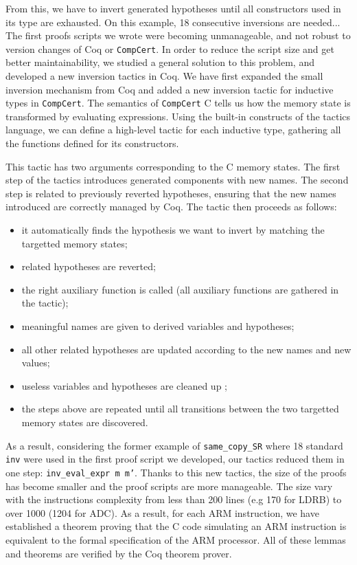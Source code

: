 \documentclass[twocolumn]{article}
\newcommand{\coqdockw}[1]{\texttt{#1}}
\newcommand{\inv}{\coqdockw{inv}\xspace}
\newcommand{\compcert}{\texttt{CompCert}\xspace}
\begin{document}
From this, we have to invert generated hypotheses until all
constructors used in its type are exhausted. On this example, 18
consecutive inversions are needed... The first proofs scripts we wrote
were becoming unmanageable, and not robust to version changes of Coq
or \compcert.  In order to reduce the script size and get better
maintainability, we studied a general solution to this problem, and
developed a new inversion tactics in Coq. We have first expanded the
small inversion mechanism from Coq and added a new inversion tactic
for inductive types in \compcert.  The semantics of \compcert C tells
us how the memory state is transformed by evaluating expressions.
Using the built-in constructs of the tactics language, we can define a
high-level tactic for each inductive type, gathering all the functions
defined for its constructors.

This tactic has two arguments corresponding to the C memory states.
The first step of the tactics introduces generated components with new
names.  The second step is related to previously reverted hypotheses,
ensuring that the new names introduced are correctly managed by Coq.
The tactic then proceeds as follows:
\begin{itemize}
\item
it automatically finds the hypothesis we want
to invert by matching the targetted memory states;
\item
related hypotheses are reverted;
\item
the right auxiliary function is called
(all auxiliary functions are gathered in the tactic);
\item
meaningful names are given to derived variables and hypotheses;
\item
all other related hypotheses are updated according to the new names
and new values;
\item
useless variables and hypotheses are cleaned up ;
\item
the steps above are repeated until all transitions between
the two targetted memory states are discovered.
\end{itemize}
\noindent
As a result, considering the former example of \texttt{same\_copy\_SR}
where 18 standard \inv were used in the first proof script we
developed, our tactics reduced them in one step:
\texttt{inv\_eval\_expr~m~m'}.  Thanks to this new tactics, the size
of the proofs has become smaller and the proof scripts are more
manageable. The size vary with the instructions complexity from less
than 200 lines (e.g 170 for LDRB) to over 1000 (1204 for ADC).  As a
result, for each ARM instruction, we have established a theorem
proving that the C code simulating an ARM instruction is equivalent to
the formal specification of the ARM processor. All of these lemmas and
theorems are verified by the Coq theorem prover.
\end{document}
